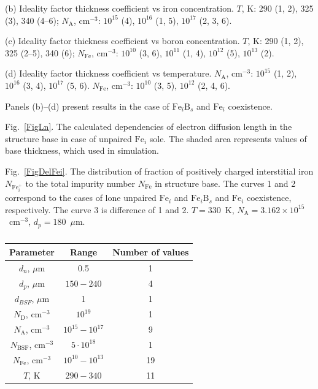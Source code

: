 \documentclass[12pt]{article}
\begin{document}
(b) Ideality factor thickness coefficient vs iron concentration.
$T$, K: 290 (1, 2), 325 (3), 340 (4--6);
$N_\mathrm{A}$, cm$^{-3}$: $10^{15}$ (4), $10^{16}$ (1, 5),  $10^{17}$ (2, 3, 6).

(c) Ideality factor thickness coefficient vs boron concentration.
$T$, K: 290 (1, 2), 325 (2--5), 340 (6);
$N_\mathrm{Fe}$, cm$^{-3}$: $10^{10}$ (3, 6), $10^{11}$ (1, 4),  $10^{12}$ (5), $10^{13}$ (2).

(d) Ideality factor thickness coefficient vs temperature.
$N_\mathrm{A}$, cm$^{-3}$: $10^{15}$ (1, 2), $10^{16}$ (3, 4),  $10^{17}$ (5, 6).
$N_\mathrm{Fe}$, cm$^{-3}$: $10^{10}$ (3, 5), $10^{12}$ (2, 4, 6).

Panels (b)--(d) present results in  the case of $\mathrm{Fe}_i\mathrm{B}_s$ and $\mathrm{Fe}_i$ coexistence.

 Fig.~\ref{FigLn}.
The calculated dependencies of electron diffusion length in the structure base
in case of unpaired $\mathrm{Fe}_i$ sole.
The shaded area represents values of base thickness, which used in simulation.

 Fig.~\ref{FigDelFei}.
The distribution of fraction of positively charged interstitial iron $N_{\mathrm{Fe}_i^+}$ to the total
impurity number $N_{\mathrm{Fe}}$ in structure base.
The curves 1 and 2 correspond to the cases of lone unpaired $\mathrm{Fe}_i$ and $\mathrm{Fe}_i\mathrm{B}_s$ and $\mathrm{Fe}_i$ coexistence,
respectively.
The curve 3 is difference of 1 and 2.
$T=330$~K, $N_\mathrm{A}=3.162\times10^{15}$~cm$^{-3}$, $d_p=180$~$\mu$m.



\newpage

\begin{table}
\caption{\label{tabParametr}
}
\begin{tabular}{|c|c|c|}
\hline
Parameter& Range& Number of values\\
\hline
$d_n$, $\mu$m&0.5&1\\
\hline
$d_p$, $\mu$m&$150-240$&4\\
\hline
$d_{BSF}$, $\mu$m&1&1\\
\hline
$N_\mathrm{D}$, cm$^{-3}$&$10^{19}$&1\\
\hline
$N_\mathrm{A}$, cm$^{-3}$&$10^{15}-10^{17}$&9\\
\hline
$N_\mathrm{BSF}$, cm$^{-3}$&$5\cdot10^{18}$&1\\
\hline
$N_\mathrm{Fe}$, cm$^{-3}$&$10^{10}-10^{13}$&19\\
\hline
$T$, K&$290-340$&11\\
\hline
\end{tabular}
\end{table}
\end{document}
